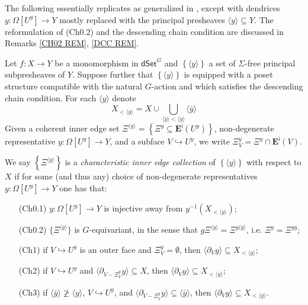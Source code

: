 \documentclass[a4paper,10pt
,draft
]{article}%
\renewcommand{\1}{\eta}%
\begin{document}
The following essentially replicates \cite[Def. 3.1]{BP_edss} as generalized in \cite[Rem. 3.7]{BP_edss},
except with dendrices
$y \colon \Omega[U^y] \to Y$
mostly replaced with the principal presheaves
$\langle y \rangle \subseteq Y$. 
The reformulation of (Ch0.2) and the descending chain condition
are discussed in Remarks \ref{CH02 REM}, \ref{DCC REM}.

\begin{definition}\label{CHAREDGE DEF}
Let $f\colon X \to Y$ be a monomorphism in 
$\mathsf{dSet}^G$ and 
$\left\{ \langle y \rangle\right\}$
a set of $\Sigma$-free principal subpresheaves of $Y$. 
Suppose further that 
$\left\{ \langle y \rangle \right\}$ is equipped 
with a poset structure compatible with the natural $G$-action
and which satisfies the descending chain condition.
For each $\langle y \rangle$ denote
\[
X_{< \langle y \rangle} = X \cup 
\bigcup_{\langle\bar{y}\rangle < \langle y \rangle} \langle \bar{y} \rangle
\]
Given a coherent inner edge set 
$
\Xi^{\langle y \rangle} =
\left\{ \Xi^y \subseteq \boldsymbol{E}^{\mathsf{i}}(U^y)\right\}$,
non-degenerate representative
$y \colon \Omega[U^y] \to Y$, and a subface $V \hookrightarrow U^y$,
we write
$\Xi^y_V = \Xi^y \cap \boldsymbol{E}^{\mathsf{i}}(V)$.

We say
$
\left\{ \Xi^{\langle y \rangle} \right \} 
$
is a \emph{characteristic inner edge collection} 
of $\left\{ \langle y \rangle \right\}$ with respect to $X$ if
for some (and thus any) choice of non-degenerate representatives
$y\colon \Omega[U^y] \to Y$ one has that:
\begin{enumerate}
\item[(Ch0.1)] $y \colon \Omega[U^y] \to Y$ is injective away from
$y^{-1}\left( X_{< \langle y \rangle} \right)$; 
\item[(Ch0.2)]
$\{\Xi^{\langle y \rangle}\}$ is $G$-equivariant, in the sense that
$g \Xi^{\langle y \rangle} =
\Xi^{g \langle y \rangle}$,
i.e. $\Xi^y = \Xi^{gy}$;
\item[(Ch1)] if $V \hookrightarrow U^y$ is an outer face and $\Xi^y_V = \emptyset$,
then $\langle \partial_V y \rangle \subseteq X_{< \langle y \rangle}$;
\item[(Ch2)] if $V \hookrightarrow U^y$ and
$\langle \partial_{V-\Xi^y_V} y\rangle \subseteq X$,
then
$\langle \partial_V y\rangle \subseteq X_{< \langle y \rangle}$;
\item[(Ch3)] if $\langle \bar{y} \rangle \not \geq \langle y \rangle$,
$V \hookrightarrow U^y$,
and
$\langle \partial_{V-\Xi^y_V} y\rangle \subseteq \langle \bar{y} \rangle$,
then
$\langle \partial_V y\rangle \subseteq X_{< \langle y \rangle}$.
\end{enumerate}
\end{definition}
\end{document}
